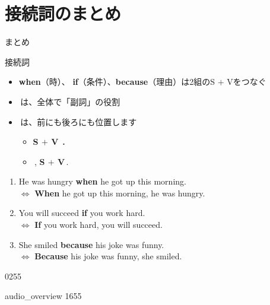 \documentclass[aspectratio=169,xcolor={dvipsnames,table}]{beamer}
\begin{document}
\section{接続詞のまとめ}
\begin{frame}[plain,t]{まとめ}
\begin{block}{接続詞}
 \begin{itemize}[square]\small
  \item<1-> \textbf{when}（時）、 \textbf{if}（条件）、\textbf{because}（理由）は2組のS $+$ Vをつなぐ
 \item<2->   \,は、全体で「副詞」の役割
 \item<3->   \,は、前にも後ろにも位置します
	 \begin{itemize}[circle]
	  \setlength{\itemsep}{4pt}
	  \item {\bfseries S $+$ V}\,\,\,\textbf{.}
	  \item {}\,,\,\,{\bfseries S $+$ V}\,.\hspace{20pt}\visible<4->{$\longleftarrow$\,コンマに注意！}
	 \end{itemize}
 \end{itemize}
\end{block}

\begin{enumerate}\small
 \item<5-> He was hungry \textbf{when} he got up this morning.\\
$\Longleftrightarrow$ \textbf{When} he got up this morning, he was hungry.
 \item<6-> You will succeed \textbf{if} you work hard.\\
$\Longleftrightarrow$ \textbf{If} you work hard, you will succeed.
 \item<7-> She smiled \textbf{because} his joke was funny.\\
$\Longleftrightarrow$ \textbf{Because} his joke was funny, she smiled.
\end{enumerate}

\vspace{-25pt}
\hfill{\tiny 0255}\,{\scriptsize {}}


\vspace{-10pt}
\hfill{\tiny audio\_overview 1655}\,{\scriptsize {}}
\end{frame}
\end{document}
